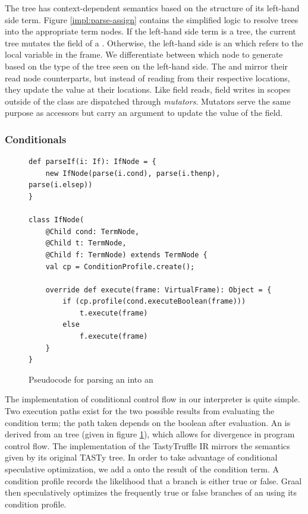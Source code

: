The  tree has context-dependent semantics based on the structure of its left-hand side term.
Figure \ref{impl:parse-assign} contains the simplified logic to resolve  trees into the appropriate term nodes.
If the left-hand side term is a  tree, the current tree mutates the field of a .
Otherwise, the left-hand side is an  which refers to the local variable in the frame.
We differentiate between which node to generate based on the type of the tree seen on the left-hand side.
The  and  mirror their read node counterparts, but instead of reading from their respective locations, they update the value at their locations.
Like field reads, field writes in scopes outside of the class are dispatched through \textit{mutators}.
Mutators serve the same purpose as accessors but carry an argument to update the value of the field.

\subsubsection*{Conditionals}

\begin{figure}[!htb]
\begin{verbatim}
def parseIf(i: If): IfNode = {
	new IfNode(parse(i.cond), parse(i.thenp), parse(i.elsep))
}
	
class IfNode(
	@Child cond: TermNode, 
	@Child t: TermNode, 
	@Child f: TermNode) extends TermNode {
	val cp = ConditionProfile.create();
		
	override def execute(frame: VirtualFrame): Object = {
		if (cp.profile(cond.executeBoolean(frame)))
			t.execute(frame)
		else 
			f.execute(frame)		
	}
}
\end{verbatim}
\caption{Pseudocode for parsing an  into an }
\label{impl:if}
\end{figure}

The implementation of conditional control flow in our interpreter is quite simple.
Two execution paths exist for the two possible results from evaluating the condition term; the path taken depends on the boolean after evaluation.
An  is derived from an  tree (given in figure \ref{impl:if}), which allows for divergence in program control flow.
The implementation of the TastyTruffle IR mirrors the semantics given by its original TASTy tree.
In order to take advantage of conditional speculative optimization, we add a  onto the result of the condition term.
A condition profile records the likelihood that a branch is either true or false.
Graal then speculatively optimizes the frequently true or false branches of an  using its condition profile.

